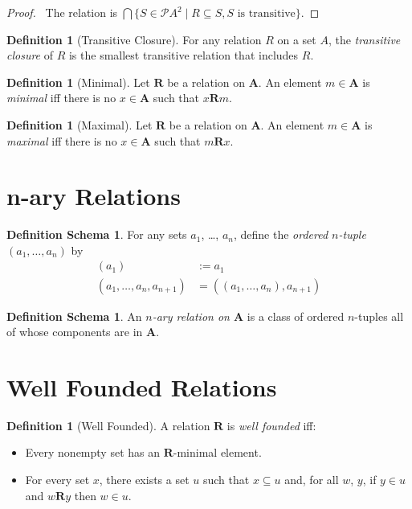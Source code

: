 \documentclass{book}
\let\qed\relax
\theoremstyle{definition}
\newtheorem{df}[ax]{Definition}
\newtheorem{dfs}[ax]{Definition Schema}
\begin{document}
\begin{proof}
\pf\ The relation is $\bigcap \{ S \in \mathcal{P} A^2 \mid R \subseteq S, S \text{ is transitive} \}$. \qed
\end{proof}

\begin{df}[Transitive Closure]
For any relation $R$ on a set $A$, the \emph{transitive closure} of $R$ is the smallest transitive relation that includes $R$.
\end{df}

\begin{df}[Minimal]
Let $\mathbf{R}$ be a relation on $\mathbf{A}$. An element $m \in \mathbf{A}$ is \emph{minimal} iff there is no $x \in \mathbf{A}$ such that $x \mathbf{R} m$.
\end{df}

\begin{df}[Maximal]
Let $\mathbf{R}$ be a relation on $\mathbf{A}$. An element $m \in \mathbf{A}$ is \emph{maximal} iff there is no $x \in \mathbf{A}$ such that $m \mathbf{R} x$.
\end{df}

\section{n-ary Relations}

\begin{dfs}
For any sets $a_1$, \ldots, $a_n$, define the \emph{ordered $n$-tuple} $(a_1, \ldots, a_n)$ by
\begin{align*}
(a_1) & := a_1 \\
(a_1, \ldots, a_n, a_{n+1}) & = ((a_1, \ldots, a_n), a_{n+1})
\end{align*}
\end{dfs}

\begin{dfs}
An \emph{$n$-ary relation on $\mathbf{A}$} is a class of ordered $n$-tuples all of whose components are in $\mathbf{A}$.
\end{dfs}

\section{Well Founded Relations}

\begin{df}[Well Founded]
A relation $\mathbf{R}$ is \emph{well founded} iff:
\begin{itemize}
\item Every nonempty set has an $\mathbf{R}$-minimal element.
\item For every set $x$, there exists a set $u$ such that $x \subseteq u$ and, for all $w$, $y$, if $y \in u$ and $w \mathbf{R} y$ then $w \in u$.
\end{itemize}
\end{df}
\end{document}
